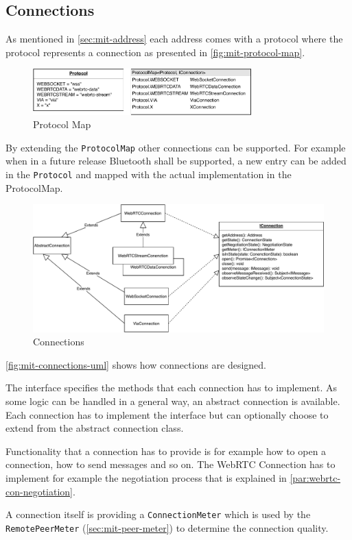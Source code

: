 \subsection{Connections}\label{sec:mit-connections}
As mentioned in \vref{sec:mit-address} each address comes with a protocol where the protocol represents a connection as presented in \vref{fig:mit-protocol-map}.

\begin{figure}
\centering
\includegraphics[width=0.75\textwidth]{graphics/implementation/mitosis-architecture-connections-protocol-map.pdf}
\caption{Protocol Map}
\label{fig:mit-protocol-map}
\end{figure}

By extending the \lstinline|ProtocolMap| other connections can be supported. For example when in a future release Bluetooth shall be supported, a new entry can be added in the \lstinline|Protocol| and mapped with the actual implementation in the ProtocolMap.

\begin{figure}
\centering
\includegraphics[width=1\textwidth]{graphics/implementation/mitosis-architecture-connections.pdf}
\caption{Connections}\label{sec:mit-connections}
\label{fig:mit-connections-uml}
\end{figure}

\vref{fig:mit-connections-uml} shows how connections are designed.

The interface specifies the methods that each connection has to implement. As some logic can be handled in a general way, an abstract connection is available. Each connection has to implement the interface but can optionally choose to extend from the abstract connection class.

Functionality that a connection has to provide is for example how to open a connection, how to send messages and so on. The WebRTC Connection has to implement for example the negotiation process that is explained in \vref{par:webrtc-con-negotiation}.

A connection itself is providing a \lstinline|ConnectionMeter| which is used by the \lstinline|RemotePeerMeter| (\vref{sec:mit-peer-meter}) to determine the connection quality.